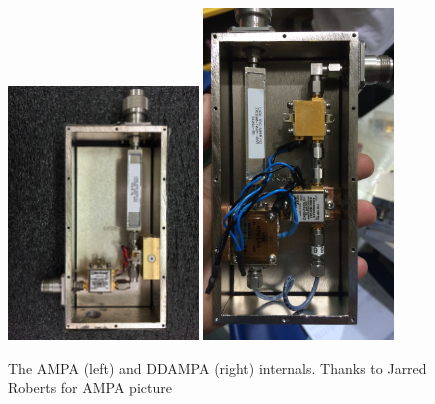 		
\begin{figure}
\centering
	\includegraphics[width=0.45\textwidth]{figures/AMPA}
	\includegraphics[width=0.45\textwidth]{figures/DDAMPA}	
	\caption{The AMPA (left) and DDAMPA (right) internals.  Thanks to Jarred Roberts for AMPA picture}
	\label{fig:AMPAandDDAMPA}
\end{figure}	

